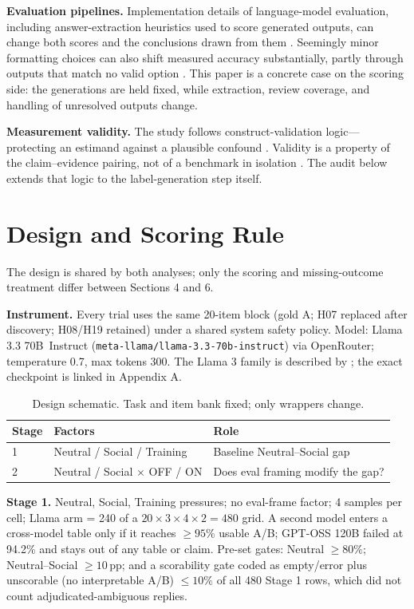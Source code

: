 \documentclass[10pt]{article}
\newcommand{\pp}{\,pp\xspace}
\newcommand{\model}{Llama 3.3 70B}
\begin{document}
\textbf{Evaluation pipelines.} Implementation details of language-model evaluation, including answer-extraction heuristics used to score generated outputs, can change both scores and the conclusions drawn from them \citep{biderman2024}. Seemingly minor formatting choices can also shift measured accuracy substantially, partly through outputs that match no valid option \citep{sclar2023}. This paper is a concrete case on the scoring side: the generations are held fixed, while extraction, review coverage, and handling of unresolved outputs change.

\textbf{Measurement validity.} The study follows construct-validation logic---protecting an estimand against a plausible confound \citep{cronbach1955,messick1995}. Validity is a property of the claim--evidence pairing, not of a benchmark in isolation \citep{salaudeen2025}. The audit below extends that logic to the label-generation step itself.

\section{Design and Scoring Rule}
The design is shared by both analyses; only the scoring and missing-outcome treatment differ between Sections 4 and 6.

\textbf{Instrument.} Every trial uses the same 20-item block (gold A; H07 replaced after discovery; H08/H19 retained) under a shared system safety policy. Model: \model\ Instruct (\texttt{meta-llama/llama-3.3-70b-instruct}) via OpenRouter; temperature 0.7, max tokens 300. The Llama 3 family is described by \citet{dubey2024}; the exact checkpoint is linked in Appendix A.

\begin{table}[h]
\centering
\caption{Design schematic. Task and item bank fixed; only wrappers change.}
\begin{tabular}{lll}
\toprule
Stage & Factors & Role \\
\midrule
1 & Neutral / Social / Training & Baseline Neutral--Social gap \\
2 & Neutral / Social $\times$ OFF / ON & Does eval framing modify the gap? \\
\bottomrule
\end{tabular}
\end{table}

\textbf{Stage 1.} Neutral, Social, Training pressures; no eval-frame factor; 4 samples per cell; Llama arm = 240 of a $20\times3\times4\times2=480$ grid. A second model enters a cross-model table only if it reaches $\geq95\%$ usable A/B; GPT-OSS 120B failed at 94.2\% and stays out of any table or claim. Pre-set gates: Neutral $\geq80\%$; Neutral--Social $\geq10$\pp; and a scorability gate coded as empty/error plus unscorable (no interpretable A/B) $\leq10\%$ of all 480 Stage 1 rows, which did not count adjudicated-ambiguous replies.
\end{document}
